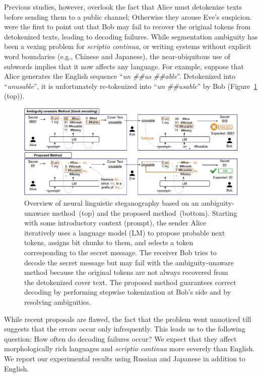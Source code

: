 \documentclass[11pt]{article}
\begin{document}
Previous studies, however, overlook the fact that Alice must detokenize texts before sending them to a public channel; Otherwise they arouse Eve's suspicion.
\citet{ueoka-etal-2021-frustratingly} were the first to point out that Bob may fail to recover the original tokens from detokenized texts, leading to decoding failures.
While segmentation ambiguity has been a vexing problem for \textit{scriptio continua}, or writing systems without explicit word boundaries (e.g., Chinese and Japanese), the near-ubiquitous use of subwords implies that it now affects any language.
For example, suppose that Alice generates the English sequence ``\textit{un} \textit{\#\#us} \textit{\#\#able}''.
Detokenized into ``\textit{unusable}'', it is unfortunately re-tokenized into ``\textit{un} \textit{\#\#usable}'' by Bob (Figure~\ref{fig:proposed} (top)).

\begin{figure}[t]
\centering
\includegraphics[width=\linewidth]{image.pdf}
\caption{Overview of neural linguistic steganography based on an ambiguity-unaware method~(top) and the proposed method~(bottom).
Starting with some introductory context (prompt), the sender Alice iteratively uses a language model (LM) to propose probable next tokens, assigns bit chunks to them, and selects a token corresponding to the secret message. 
The receiver Bob tries to decode the secret message but may fail with the ambiguity-unaware method because the original tokens are not always recovered from the detokenized cover text.
The proposed method guarantees correct decoding by performing stepwise tokenization at Bob's side and by resolving ambiguities.
}
\label{fig:proposed}
\end{figure}


While recent proposals are flawed, the fact that the problem went unnoticed till \citet{ueoka-etal-2021-frustratingly} suggests that the errors occur only infrequently.
This leads us to the following question: How often do decoding failures occur?
We expect that they affect morphologically rich languages and \textit{scriptio continua} more severely than English.
We report our experimental results using Russian and Japanese in addition to English.
\end{document}
